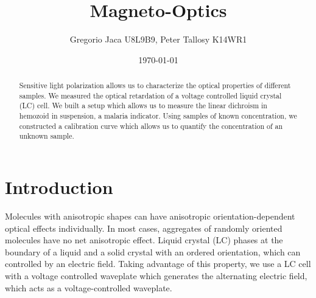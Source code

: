 \documentclass[12pt,a4paper]{article}
\title{Magneto-Optics}
\author{Gregorio Jaca U8L9B9, Peter Tallosy K14WR1}
\date{\today}
\begin{document}
\maketitle

\begin{abstract}

    Sensitive light polarization allows us to characterize the optical properties of different samples.
    We measured the optical retardation of a voltage controlled liquid crystal (LC) cell. We built a setup which allows us to measure the linear dichroism in hemozoid in suspension, a malaria indicator. Using samples of known concentration, we constructed a calibration curve which allows us to quantify the concentration of an unknown sample.

\end{abstract}

\section{Introduction}

Molecules with anisotropic shapes can have anisotropic orientation-dependent optical effects individually. In most cases, aggregates of randomly oriented molecules have no net anisotropic effect. Liquid crystal (LC) phases at the boundary of a liquid and a solid crystal with an ordered orientation, which can controlled by an electric field. Taking advantage of this property, we use a LC cell with a voltage controlled waveplate which generates the alternating electric field, which acts as a voltage-controlled waveplate.
\end{document}
